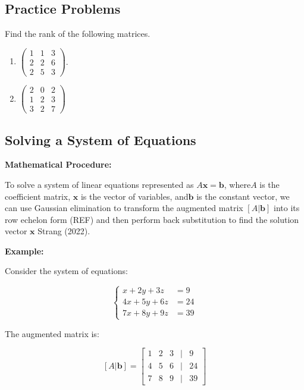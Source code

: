 \documentclass[
  letterpaper,
  DIV=11,
  numbers=noendperiod]{scrreprt}
\providecommand{\tightlist}{%
  \setlength{\itemsep}{0pt}\setlength{\parskip}{0pt}}\usepackage{longtable,booktabs,array}
\theoremstyle{plain}
\theoremstyle{definition}
\theoremstyle{remark}
\begin{document}
\subsection{Practice Problems}\label{practice-problems}

Find the rank of the following matrices.

\begin{enumerate}
\def\labelenumi{\arabic{enumi}.}
\tightlist
\item
  \(\begin{pmatrix} 1&1&3\\ 2&2&6\\ 2&5&3\end{pmatrix}\).
\item
  \(\begin{pmatrix} 2&0&2\\ 1&2&3\\ 3&2&7\end{pmatrix}\)
\end{enumerate}

\subsection{Solving a System of
Equations}\label{solving-a-system-of-equations}

\textbf{Mathematical Procedure:}

To solve a system of linear equations represented as
\(A \mathbf{x} = \mathbf{b}\), where\(A\) is the coefficient matrix,
\(\mathbf{x}\) is the vector of variables, and\(\mathbf{b}\) is the
constant vector, we can use Gaussian elimination to transform the
augmented matrix \([A | \mathbf{b}]\) into its row echelon form (REF)
and then perform back substitution to find the solution vector
\(\mathbf{x}\) Strang (2022).

\textbf{Example:}

Consider the system of equations:

\[\begin{cases}
x + 2y + 3z &= 9 \\
4x + 5y + 6z& = 24 \\
7x + 8y + 9z& = 39
\end{cases}\]

The augmented matrix is:

\[[A | \mathbf{b}] = \begin{bmatrix} 1 & 2 & 3 & | & 9 \\ 4 & 5 & 6 & | & 24 \\ 7 & 8 & 9 & | & 39 \end{bmatrix}\]
\end{document}
